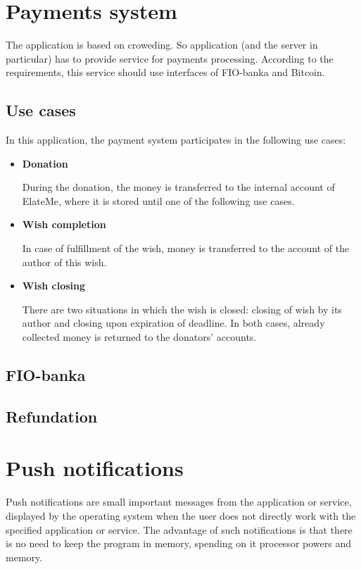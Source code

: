 \newcommand{\uitem}[1]{
\item \textbf{#1} \par
}
\newcommand{\aitem}[1]{
\item \textbf{#1} \par
}
\section{Payments system}
The application is based on croweding. So application (and the server in particular) has to provide service for
payments processing. According to the requirements, this service should use interfaces of FIO-banka and Bitcoin.

\subsection{Use cases}
In this application, the payment system participates in the following use cases:

\begin{itemize}
\uitem{Donation}
During the donation, the money is transferred to the internal account of ElateMe, where it is stored until one of
the following use cases.

\uitem{Wish completion}
In case of fulfillment of the wish, money is transferred to the account of the author of this wish.

\uitem{Wish closing}
There are two situations in which the wish is closed: closing of wish by its author and closing upon expiration of
deadline. In both cases, already collected money is returned to the donators' accounts.
\end{itemize}

\subsection{FIO-banka}


\subsection{Refundation}




\section{Push notifications}
Push notifications are small important messages from the application or service, displayed by the operating system when
the user does not directly work with the specified application or service. The advantage of such notifications is that
there is no need to keep the program in memory, spending on it processor powers and memory.

